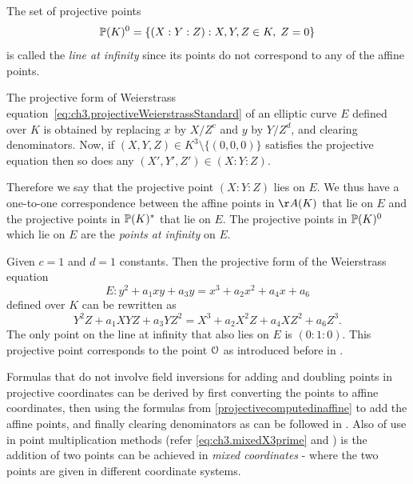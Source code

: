 The set of projective points
\begin{equation}
	\mathbb{P}(K)^0 = \{(X : Y : Z) : X, Y, Z \in K,\; Z = 0\}
	\label{eq:ch3.lineAtInfinity}
\end{equation}
is called the \textit{line at infinity} since its points do not correspond to any of the
affine points.

The projective form of Weierstrass equation~\eqref{eq:ch3.projectiveWeierstrassStandard} of an
elliptic curve $E$ defined over $K$ is obtained by replacing $x$ by $X/Z^c$ and $y$ by
$Y/Z^d$, and clearing denominators. Now, if $(X, Y, Z) \in K^3 \setminus \{(0,0,0)\}$
satisfies the projective equation then so does any $(X', Y', Z') \in (X : Y : Z)$.

Therefore we say that the projective point $(X : Y : Z)$ lies on $E$. We thus have a one-to-one correspondence between the affine points in $\AA(K)$ that lie on $E$ and the projective points in $\mathbb{P}(K)^*$ that lie on $E$. The projective points in $\mathbb{P}(K)^0$ which lie on $E$ are the \textit{points at infinity} on $E$.


\begin{example}
	\label{ex:ch03.standardProjectiveCoordinates}
	Given $c = 1$ and $d = 1$ constants. Then the projective form of the Weierstrass equation
	\begin{equation}
		E : y^2 + a_1 xy + a_3 y = x^3 + a_2 x^2 + a_4 x + a_6
		\label{eq:ch3.weierstrassStandardProj}
	\end{equation}
	defined over $K$ can be rewritten as 
	\begin{equation}
		Y^2 Z + a_1 XYZ + a_3 YZ^2 = X^3 + a_2 X^2 Z + a_4 XZ^2 + a_6 Z^3.
		\label{eq:ch3.projectiveWeierstrassStandard}
	\end{equation}
	The only point on the line at infinity that also lies on $E$ is $(0 : 1 : 0)$. This
	projective point corresponds to the point $\EuScript{O}$ as introduced before in  .
\end{example}

Formulas that do not involve field inversions for adding and doubling points in projective
coordinates can be derived by first converting the points to affine coordinates, then using
the formulas from \ref{projectivecomputedinaffine}  to add the affine points, and
finally clearing denominators as can be followed in . Also of use in point multiplication methods (refer  \ref{eq:ch3.mixedX3prime} and  ) is the addition of two points can be achieved in \textit{mixed coordinates} - where the two points are given in different coordinate
systems. 


